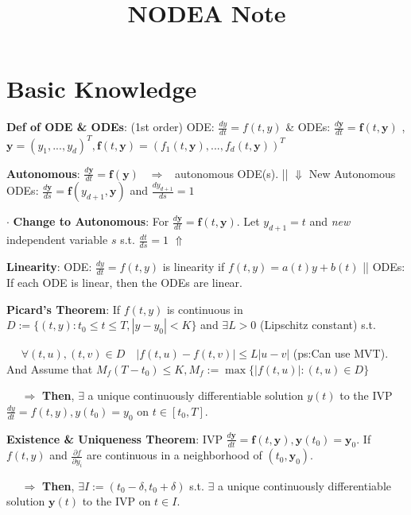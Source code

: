 \documentclass[9pt]{article}
\title{NODEA Note}
\author{}
\date{}
\begin{document}
\maketitle
\thispagestyle{fancy}
\vspace{-3.5cm}

\fontsize{10pt}{11pt}\selectfont
\setlength{\parindent}{8pt}


\section{Basic Knowledge} %

\textbf{Def of ODE \& ODEs}: { (1st order)} ODE: $\frac{dy}{dt}=f(t,y)$ \quad \& \quad ODEs: $\frac{d\mathbf{y}}{dt}=\mathbf{f}(t,\mathbf{y})$ , {\footnotesize $\mathbf{y}=(y_1,...,y_d)^T,\mathbf{f}(t,\mathbf{y})=(f_1(t,\mathbf{y}),...,f_d(t,\mathbf{y}))^T$}

\textbf{Autonomous}: $\frac{d\mathbf{y}}{dt}=\mathbf{f}(\mathbf{y})$ \ $\Rightarrow$ \ autonomous ODE(s). \quad \quad \quad || $\Downarrow$ New Autonomous ODEs: $\frac{d\mathbf{y}}{ds}=\mathbf{f}(y_{d+1},\mathbf{y})$ and $\frac{dy_{d+1}}{ds}=1$

$\cdot$ \textbf{Change to Autonomous}: For $\frac{d\mathbf{y}}{dt}=\mathbf{f}(t,\mathbf{y})$. Let $y_{d+1}=t$ and \textit{new} independent variable $s$ s.t. $\frac{dt}{ds}=1$ $\Uparrow$

\textbf{Linearity}: ODE: $\frac{dy}{dt}=f(t,y)$ is linearity if $f(t,y)=a(t)y+b(t)$ \quad || ODEs: {\small If each ODE is linear, then the ODEs are linear.}

\textbf{Picard's Theorem}: If $f(t,y)$ is continuous in $D:=\{(t,y):t_0\leq t\leq T,|y-y_0|<K\}$ and $\exists L>0$ {\footnotesize (Lipschitz constant)} s.t.

$\quad$ $\forall (t,u),(t,v)\in D \quad|f(t,u)-f(t,v)|\leq L|u-v|$ {\tiny (ps:Can use MVT)}. And Assume that $M_f(T-t_0)\leq K,M_f:=\max\{|f(t,u)|:(t,u)\in D\}$

$\quad$ $\Rightarrow$ \textbf{Then}, $\exists$ a unique continuously differentiable solution $y(t)$ to the IVP $\frac{dy}{dt}=f(t,y),y(t_0)=y_0$ on $t\in[t_0,T]$.

\textbf{Existence \& Uniqueness Theorem}: IVP $\frac{d\mathbf{y}}{dt}=\mathbf{f}(t,\mathbf{y}),\mathbf{y}(t_0)=\mathbf{y}_0$. If $f(t,y)$ and $\frac{\partial f}{\partial y_i}$ are continuous in a neighborhood of $(t_0,\mathbf{y}_0)$.

$\quad$ $\Rightarrow$ \textbf{Then}, $\exists I:=(t_0-\delta,t_0+\delta)$ s.t. $\exists$ a unique continuously differentiable solution $\mathbf{y}(t)$ to the IVP on $t\in I$.
\end{document}
